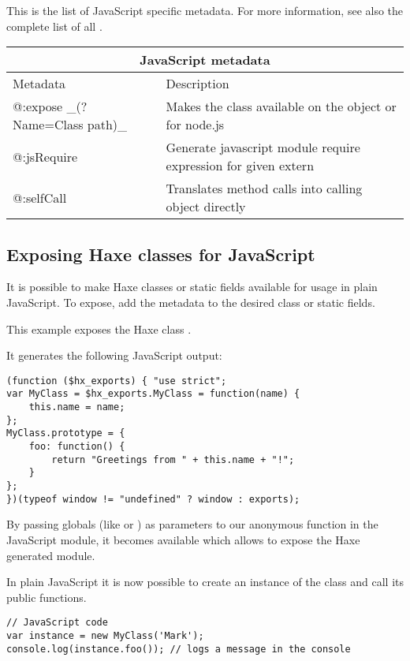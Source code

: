 This is the list of JavaScript specific metadata. For more information, see also the complete list of all .

\begin{center}
\begin{tabular}{| l | l |}
	\hline
	\multicolumn{2}{|c|}{JavaScript metadata} \\ \hline
	Metadata &  Description \\ \hline
	@:expose \_(?Name=Class path)\_  &  Makes the class available on the \expr{window} object or \expr{exports} for node.js  \\
	@:jsRequire  &  Generate javascript module require expression for given extern \\
	@:selfCall  &  Translates method calls into calling object directly \\
\end{tabular}
\end{center}

\subsection{Exposing Haxe classes for JavaScript}
\label{target-javascript-expose}

It is possible to make Haxe classes or static fields available for usage in plain JavaScript. 
To expose, add the  metadata to the desired class or static fields.

This example exposes the Haxe class .


It generates the following JavaScript output:

\begin{lstlisting}
(function ($hx_exports) { "use strict";
var MyClass = $hx_exports.MyClass = function(name) {
	this.name = name;
};
MyClass.prototype = {
	foo: function() {
		return "Greetings from " + this.name + "!";
	}
};
})(typeof window != "undefined" ? window : exports);
\end{lstlisting}

By passing globals (like  or ) as parameters to our anonymous function in the JavaScript module, it becomes available which allows to expose the Haxe generated module.

In plain JavaScript it is now possible to create an instance of the class and call its public functions.

\begin{lstlisting}
// JavaScript code
var instance = new MyClass('Mark');
console.log(instance.foo()); // logs a message in the console
\end{lstlisting}

